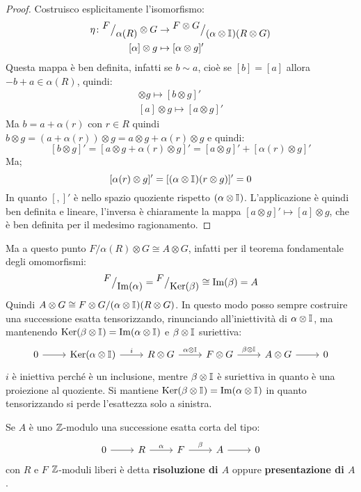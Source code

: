 \begin{proof}
Costruisco esplicitamente l'isomorfismo:
\begin{align*}
  \eta \colon {^{\textstyle F}\big/_{\textstyle \alpha(R)}} \otimes G & \to {^{\textstyle F \otimes G}\big/_{\textstyle (\alpha \otimes \mathbb{I}_{})(R \otimes G)}} \\
  [\alpha] \otimes g & \mapsto [\alpha \otimes g]'
\end{align*}
Questa mappa è ben definita, infatti se $ b \sim a $, cioè se $ [b] = [a] $ allora
$ -b + a \in \alpha(R) $, quindi:
\begin{gather*}
  [b] \otimes g \mapsto [b \otimes g]' \\
  [a] \otimes g \mapsto [a \otimes g]'
\end{gather*}
Ma $ b = a + \alpha(r) $ con $ r \in R $ quindi $ b \otimes g = (a + \alpha(r)) \otimes g = a \otimes g + \alpha(r) \otimes g $
e quindi:
\[
  [b \otimes g]' = [a \otimes g + \alpha(r) \otimes g]' = [a \otimes g]' + [\alpha(r) \otimes g]'
\]
Ma;
\[
  [\alpha(r) \otimes g]' = [(\alpha \otimes \mathbb{I}_{})(r \otimes g)]' = 0
\]
In quanto $ [,]' $ è nello spazio quoziente rispetto $ (\alpha \otimes \mathbb{I}_{}) $.
L'applicazione è quindi ben definita e lineare, l'inversa è chiaramente la
mappa $ [a \otimes g]' \mapsto [a] \otimes g $, che è ben definita per il medesimo ragionamento.
\end{proof}


Ma a questo punto $ {F} \slash {\alpha(R)} \otimes G \cong A \otimes G $, infatti per il teorema fondamentale
degli omomorfismi:
\[
  {^{\textstyle F}\big/_{\textstyle \mathrm{Im}( \alpha )}} = {^{\textstyle F}\big/_{\textstyle \mathrm{Ker}( \beta)}} \cong \mathrm{Im}( \beta ) = A
\]
Quindi
$ A \otimes G \cong {F \otimes G} \slash {{(\alpha \otimes \mathbb{I}_{})(R \otimes G)}} $. In questo modo posso sempre
costruire una successione esatta tensorizzando, rinunciando all'iniettività di
$ \alpha \otimes \mathbb{I}_{} $, ma mantenendo
$ \mathrm{Ker}( \beta \otimes \mathbb{I}_{}) = \mathrm{Im}( \alpha \otimes \mathbb{I}_{} ) $ e $ \beta \otimes \mathbb{I}_{} $ suriettiva:
\[
  \begin{tikzcd}
    0 \rar & \ker{\alpha \otimes \Id{}} \rar{i} & R \otimes G \rar{\alpha \otimes \Id{}} & F \otimes G \rar{\beta \otimes \Id{}} & A \otimes G \rar & 0
  \end{tikzcd}
\]
$ i $ è iniettiva perché è un inclusione, mentre $ \beta \otimes \mathbb{I}_{} $ è suriettiva
in quanto è una proiezione al quoziente. Si mantiene $ \mathrm{Ker}( \beta \otimes \mathbb{I}_{}) = \mathrm{Im}( \alpha \otimes \mathbb{I}_{} ) $
in quanto tensorizzando si perde l'esattezza solo a sinistra.

\begin{definition}
  Se $ A $ è uno $ \mathbb{Z} $-modulo una successione esatta corta del tipo:
  \[
    \begin{tikzcd}
      0 \rar & R \rar{\alpha} & F \rar{\beta} & A \rar & 0
    \end{tikzcd}
  \]
  con $ R $ e $ F $ $ \mathbb{Z} $-moduli liberi è detta \textbf{risoluzione di
    $ A $} oppure \textbf{presentazione di
    $ A $}.
\end{definition}

